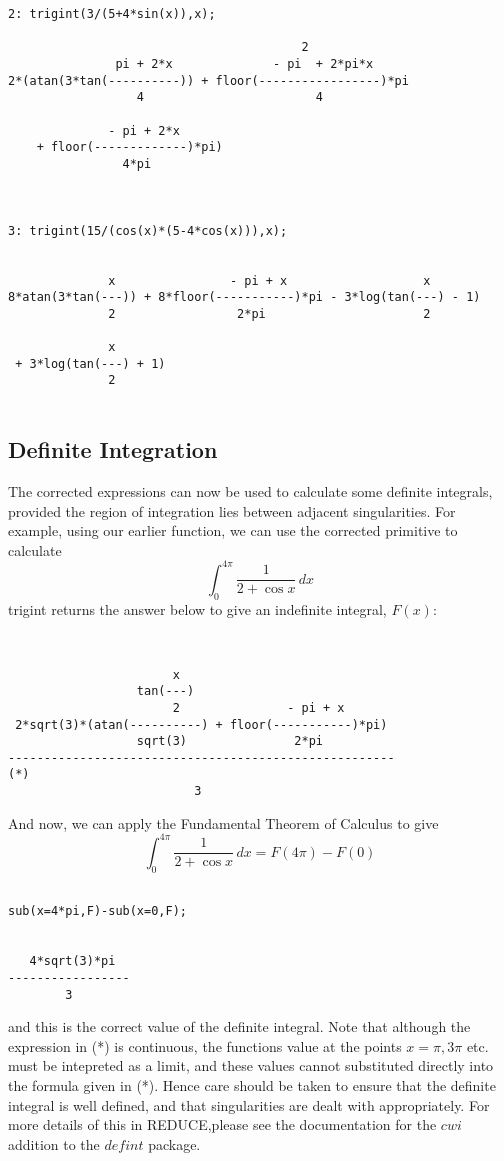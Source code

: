 \begin{verbatim}
2: trigint(3/(5+4*sin(x)),x);

                                         2
               pi + 2*x              - pi  + 2*pi*x
2*(atan(3*tan(----------)) + floor(-----------------)*pi
                  4                        4

              - pi + 2*x
    + floor(-------------)*pi)
                4*pi



3: trigint(15/(cos(x)*(5-4*cos(x))),x);


              x                - pi + x                   x
8*atan(3*tan(---)) + 8*floor(-----------)*pi - 3*log(tan(---) - 1)
              2                 2*pi                      2

              x
 + 3*log(tan(---) + 1)
              2


\end{verbatim}
\subsection{Definite Integration}
The corrected expressions can now be used to calculate some definite integrals, provided the region of integration lies between adjacent singularities. For example, using our earlier function, we can use the corrected primitive to calculate  
     \begin{equation} \int_{0}^{4\pi} \frac{1}{2+\cos x}\,dx \end{equation}
trigint returns the answer below to give an indefinite integral, $F(x)$:
\begin{verbatim}
        

                       x
                  tan(---)
                       2               - pi + x
 2*sqrt(3)*(atan(----------) + floor(-----------)*pi)
                  sqrt(3)               2*pi
------------------------------------------------------                   (*) 
                          3

\end{verbatim}
And now, we can apply the Fundamental Theorem of Calculus to give
 \begin{equation} \int_{0}^{4\pi} \frac{1}{2+\cos x}\,dx = F(4\pi)-F(0) \end{equation}
\begin{verbatim}

sub(x=4*pi,F)-sub(x=0,F);


   4*sqrt(3)*pi
-----------------
        3

\end{verbatim}
and this is the correct value of the definite integral.
Note that although the expression in (*) is continuous, the functions value at the points $x=\pi,3\pi$ etc. must be intepreted as a limit, and these values cannot substituted directly into the formula given in (*). Hence care should be taken to ensure that the definite integral is well defined, and that singularities are dealt with appropriately. For more details of this in \small{REDUCE},\normalsize please see the documentation for the $cwi$ addition to the $defint$ package.

